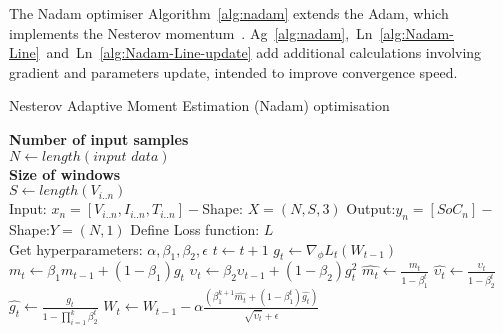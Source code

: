 %
The Nadam optimiser \mbox{Algorithm~\ref{alg:nadam}} extends the Adam, which implements the Nesterov momentum~\cite{dozat_nadam_2016}.
\mbox{Ag~\ref{alg:nadam}, Ln~\ref{alg:Nadam-Line} and Ln~\ref{alg:Nadam-Line-update}} add additional calculations involving gradient and parameters update, intended to improve convergence speed.
\begin{algorithm}
    \caption{Nesterov Adaptive Moment Estimation (Nadam) optimisation}
    \begin{algorithmic}[1]
      \STATE \textbf{Number of input samples} \\ $N\gets length(\textit{input data})$\\
      \STATE \textbf{Size of windows} \\ $S\gets length(V_{i..n})$\\
      \STATE Input: $x_n = [V_{i..n}, I_{i..n}, T_{i..n}] - $Shape: $X = (N, S, 3)$
      \STATE Output:$y_n = [SoC_{n}] - $Shape:$Y = (N, 1)$
      \STATE Define Loss function: $L$ \\
             Get hyperparameters: $\alpha, \beta_1, \beta_2, \epsilon$
      \STATE $t \gets t+1$
      \STATE $g_t \gets \nabla_\phi L_t (W_{t-1})$ 
      \STATE $m_t \gets \beta_1 m_{t-1}+(1-\beta_1) g_t $ 
      \STATE $\upsilon_t \gets \beta_2 \upsilon_{t-1}+ \left(1-\beta_2 \right)g^2_t $ 
      \STATE $\hat{m_t} \gets \frac{m_t}{1-\beta^t_1}$ 
      \STATE $\hat{\upsilon_t} \gets \frac{\upsilon_t}{1-\beta^t_2} $ 
      \STATE $\hat{g_t} \gets \frac{g_t}{1-\prod\nolimits_{i = 1}^{k}\beta^t_2} $ 
      \STATE $W_t \gets W_{t-1}-\alpha
                          \frac{\left(\beta^{k+1}_1\hat{m_t}+\left(1-\beta^t_1\right)\hat{g_t}\right)}
                               {\sqrt{\hat{\upsilon_t}}+\epsilon}$
      \ENDWHILE
    \end{algorithmic}
    \label{alg:nadam}
\end{algorithm}

